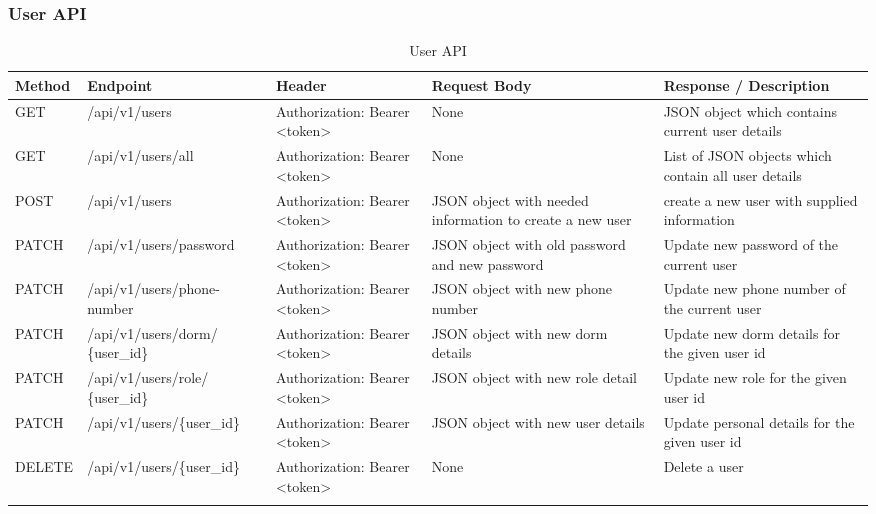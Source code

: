 \subsubsection{User API}
\begin{longtable}{|m{1.6cm}|m{5cm}|m{3cm}|m{3cm}|m{3.2cm}|}
	\hline
	\textbf{Method} & \textbf{Endpoint} & \textbf{Header}                                                                                                                            & \textbf{Request Body} & \textbf{Response / Description}   \\ \hline
	\endhead
	
	GET & /api/v1/users & Authorization: Bearer <token> & None & JSON object which contains current user details \\ \hline
	
	GET & /api/v1/users/all & Authorization: Bearer <token> & None  & List of JSON objects which contain all user details \\ \hline
	
	POST & /api/v1/users & Authorization: Bearer <token> & JSON object with needed information to create a new user & create a new user with supplied information \\ \hline
	
	PATCH & /api/v1/users/password & Authorization: Bearer <token>& JSON object with old password and new password & Update new password of the current user \\ \hline
	
	PATCH & /api/v1/users/phone-number & Authorization: Bearer <token>& JSON object with new phone number & Update new phone number of the current user \\ \hline
	
	PATCH & /api/v1/users/dorm/ \newline \{user\_id\} & Authorization: Bearer <token>& JSON object with new dorm details & Update new dorm details for the given user id \\ \hline
	
	PATCH & /api/v1/users/role/ \newline \{user\_id\} & Authorization: Bearer <token>& JSON object with new role detail & Update new role for the given user id \\ \hline
	
	PATCH & /api/v1/users/\{user\_id\} & Authorization: Bearer <token>& JSON object with new user details & Update personal details for the given user id \\ \hline
	
	
	DELETE & /api/v1/users/\{user\_id\} & Authorization: Bearer <token>& None & Delete a user \\ \hline

	
	
	\caption{User API}
	\label{tab:user-api}
	
\end{longtable}

